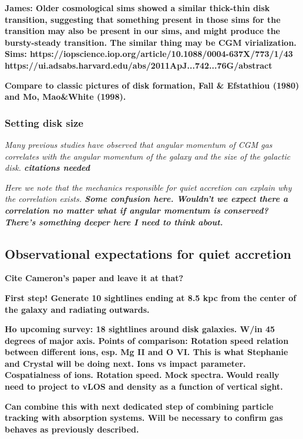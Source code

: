 \documentclass[fleqn,usenatbib]{mnras}
\begin{document}
\textbf{
James: Older cosmological sims showed a similar thick-thin disk transition, suggesting that something present in those sims for the transition may also be present in our sims, and might produce the bursty-steady transition.
The similar thing may be CGM virialization.
Sims: 
https://iopscience.iop.org/article/10.1088/0004-637X/773/1/43
https://ui.adsabs.harvard.edu/abs/2011ApJ...742...76G/abstract
}

\textbf{
Compare to classic pictures of disk formation, Fall \& Efstathiou (1980) and Mo, Mao\&White (1998).
}

\subsubsection{Setting disk size}

\textit{
Many previous studies have observed that angular momentum of CGM gas correlates with the angular momentum of the galaxy and the size of the galactic disk.
\textbf{citations needed}
}

\textit{
Here we note that the mechanics responsible for quiet accretion can explain why the correlation exists.
\textbf{Some confusion here. Wouldn't we expect there a correlation no matter what if angular momentum is conserved? There's something deeper here I need to think about.}
}

\subsection{Observational expectations for quiet accretion}
\label{s: observational expectations}

\textbf{
Cite Cameron's paper and leave it at that?
}

\textbf{
First step!
Generate 10 sightlines ending at 8.5 kpc from the center of the galaxy and radiating outwards.
}

\textbf{
Ho upcoming survey:
18 sightlines around disk galaxies.
W/in 45 degrees of major axis.
Points of comparison:
Rotation speed relation between different ions, esp. Mg II and O VI. This is what Stephanie and Crystal will be doing next.
Ions vs impact parameter.
Cospatialness of ions.
Rotation speed.
Mock spectra.
}
\textbf{
Would really need to project to vLOS and density as a function of vertical sight.
}

\textbf{
Can combine this with next dedicated step of combining particle tracking with absorption systems.
Will be necessary to confirm gas behaves as previously described.
}
\end{document}
